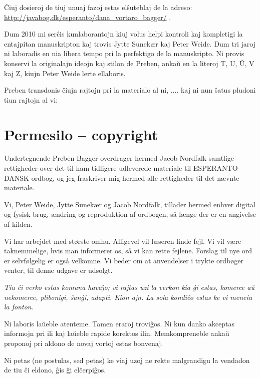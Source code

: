 {
\^Ciuj dosieroj de tiuj unuaj fazoj estas el\^suteblaj de la adreso:
\url{http://javabog.dk/esperanto/dana_vortaro_bagger/} . }

{
Dum 2010 mi ser\^cis kunlaborantojn kiuj volus helpi kontroli kaj
kompletigi la entajpitan manuskripton kaj trovis Jytte Sunek{\ae}r kaj
Peter Weide. Dum tri jaroj ni laboradis en nia libera tempo pri la
perfektigo de la manuskripto. Ni provis konservi la originalajn ideojn
kaj stilon de Preben, anka\u{u} en la literoj T, U, \u{U}, V kaj Z,
kiujn Peter Weide lerte ellaboris.}

{
Preben transdonis \^ciujn rajtojn pri la materialo al ni, .... kaj ni
nun \^satus pludoni tiun rajtojn al vi:}

\section{Permesilo -- copyright}
{
Undertegnende Preben Bagger overdrager hermed Jacob Nordfalk samtlige
rettigheder over det til ham tidligere udleverede materiale til
ESPERANTO-DANSK ordbog, og jeg fraskriver mig hermed alle rettigheder
til det n{\ae}vnte materiale.}

{
Vi, Peter Weide, Jytte Sunek{\ae}r og Jacob Nordfalk, tillader hermed
enhver digital og fysisk brug, {\ae}ndring og reproduktion af ordbogen,
s{\aa} l{\ae}nge der er en angivelse af kilden.}

{
Vi har arbejdet med st{\o}rste omhu. Alligevel vil l{\ae}seren finde
fejl. Vi vil v{\ae}re taknemmelige, hvis man informerer os, s{\aa} vi
kan rette fejlene. Forslag til nye ord er selvf{\o}lgelig er ogs{\aa}
velkomne. Vi beder om at anvendelser i trykte ordb{\o}ger venter, til
denne udgave er udsolgt.}

{
\textit{Tiu \^ci verko estas komuna hava\^{\j}o; vi rajtas uzi la verkon
}\foreignlanguage{danish}{\textit{kia}}\textit{ \^gi estas, komerce
a\u{u} nekomerce, plibonigi, \^san\^gi, adapti. Kion ajn. La sola
kondi\^co estas ke vi menci}\textit{u}\textit{ la fonton.}}

{
Ni laboris la\u{u}eble atenteme. Tamen eraroj trovi\^gos. Ni kun danko
akceptas informojn pri ili kaj la\u{u}eble rapide korektos ilin.
Memkompreneble anka\u{u} proponoj pri aldono de novaj vortoj estas
bonvenaj.}

{
Ni petas (ne postulas, sed petas) ke viaj uzoj ne rekte malgrandigu la
vendadon de tiu \^ci eldono, \^gis \^gi el\^cerpi\^gos.}


